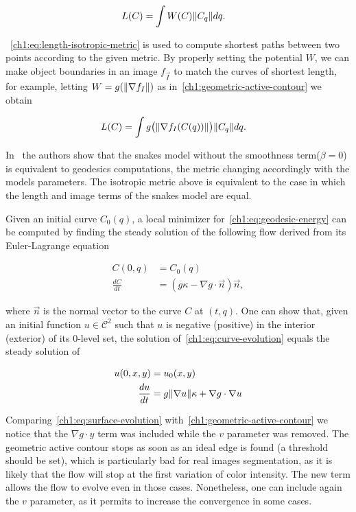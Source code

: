 \begin{align}
	L(C) &= \int{W(C)\lVert C_q\rVert dq}.
	\label{ch1:eq:length-isotropic-metric}
\end{align}

~\cref{ch1:eq:length-isotropic-metric} is used to compute shortest paths between two points according to the given metric. By properly setting the potential $W$, we can make object boundaries in an image $f_{\vec{I}}$ to match the curves of shortest length, for example, letting $W=g(\lVert\nabla f_I\rVert)$ as in~\cref{ch1:geometric-active-contour} we obtain

\begin{align}
	L(C) &= \int{g\big(\lVert\nabla f_I(C(q))\rVert\big)\lVert C_q\rVert dq}.
	\label{ch1:eq:geodesic-energy}
\end{align}

In~\cite{caselles97} the authors show that the snakes model without the smoothness term($\beta=0$) is equivalent to geodesics computations, the metric changing accordingly with the models parameters. The isotropic metric above is equivalent to the case in which the length and image terms of the snakes model are equal.

Given an initial curve $C_0(q)$, a local minimizer for~\cref{ch1:eq:geodesic-energy} can be computed by finding the steady solution of the following flow derived from its Euler-Lagrange equation

\begin{align}
	C(0,q) &= C_0(q)\\
	\frac{dC}{dt} &= (g\kappa - \nabla g \cdot \vec{n})\vec{n},
	\label{ch1:eq:curve-evolution}
\end{align}

where $\vec{n}$ is the normal vector to the curve $C$ at $(t,q)$. One can show that, given an initial function $u \in \mathcal{C}^2$ such that $u$ is negative (positive) in the interior (exterior) of its $0$-level set, the solution of~\cref{ch1:eq:curve-evolution} equals the steady solution of

\begin{align}
	u(0,x,y) &= u_0(x,y) \\
	\frac{du}{dt} &= g\lVert\nabla u\rVert\kappa + \nabla g \cdot \nabla u
	\label{ch1:eq:surface-evolution}
\end{align}

Comparing~\cref{ch1:eq:surface-evolution} with~\cref{ch1:geometric-active-contour} we notice that the $\nabla g \cdot y$ term was included while the $v$ parameter was removed. The geometric active contour stops as soon as an ideal edge is found (a threshold should be set), which is particularly bad for real images segmentation, as it is likely that the flow will stop at the first variation of color intensity. The new term allows the flow to evolve even in those cases. Nonetheless, one can include again the $v$ parameter, as it permits to increase the convergence in some cases.

